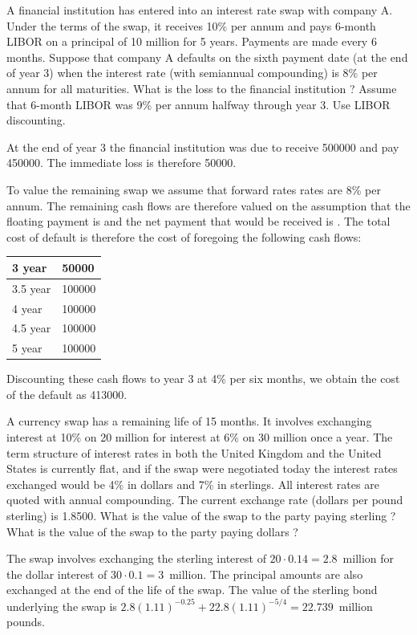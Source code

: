 \documentclass[12pt,a4paper]{exam}
\begin{document}
\begin{questions}
\question  A financial institution has entered into an interest rate swap with company A. Under the terms of the swap, it receives 10\% per annum and pays 6-month LIBOR on a principal of 10 million for 5 years. Payments are made every 6 months. 
Suppose that company A defaults on the sixth payment date (at the end of year 3) when the interest rate (with semiannual compounding) is 8\% per annum for all maturities. 
What is the loss to the financial institution ? Assume that 6-month LIBOR was 9\% per annum halfway through year 3. 
Use LIBOR discounting.

\begin{solution}
At the end of year 3 the financial institution was due to receive 500000 and pay 450000. The immediate loss is therefore 50000.

To value the remaining swap we assume that forward rates 
rates are 8\% per annum. The remaining cash flows are therefore valued on the assumption that the floating payment is and the net payment that would be received is . The
total cost of default is therefore the cost of foregoing the following cash flows:
\begin{center}
	\begin{tabular}{|l|l|}
	\hline
	3 year & 50000 \\ \hline
	3.5 year & 100000 \\ \hline
	4 year &  100000 \\ \hline
	4.5 year & 100000 \\ \hline
	5 year & 100000 \\ \hline
	\end{tabular}
\end{center}
Discounting these cash flows to year 3 at 4\% per six months, we obtain the cost of the default as 413000.
\end{solution}

\question A currency swap has a remaining life of 15 months. It involves exchanging interest at 10\% on 20 million for interest at 6\% on 30 million once a year. The term structure of interest rates in both the United Kingdom and the United States is currently flat,
and if the swap were negotiated today the interest rates exchanged would be 4\% in dollars and 7\% in sterlings. All interest rates are quoted with annual compounding. The current exchange rate (dollars per pound sterling) is 1.8500. What is the value of the swap to the party paying sterling ? What is the value of the swap to the party paying dollars ?

\begin{solution}
The swap involves exchanging the sterling interest of $20\cdot 0.14 = 2.8$~million for the dollar interest of $30\cdot 0.1 = 3$~million. 
The principal amounts are also exchanged at the end of the life of the swap. The value of the sterling bond underlying the swap is
$2.8(1.11)^{-0.25} + 22.8(1.11)^{-5/4} = 22.739$~million pounds.


\end{solution}
\end{questions}
\end{document}
